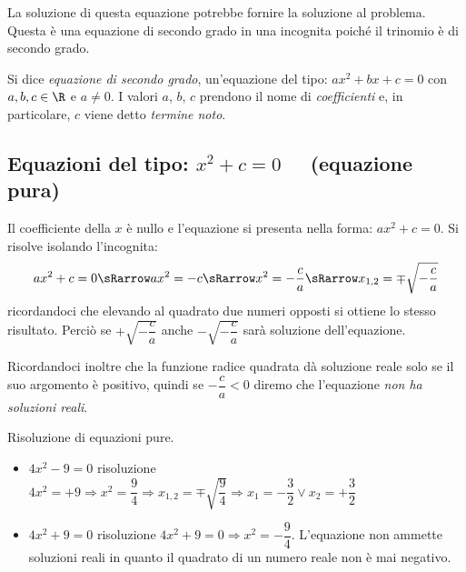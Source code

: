 La soluzione di questa equazione potrebbe fornire la soluzione al problema.
Questa è una equazione di secondo grado in una incognita poiché il trinomio è 
di secondo grado.
\begin{definizione}
Si dice \emph{equazione di secondo grado}, un'equazione del tipo: 
\(ax^2 +bx +c = 0\) con \(a, b, c \in \R\) e \(a \neq 0\). 
I valori \(a\), \(b\), \(c\) prendono il nome di \emph{coefficienti} e, in 
particolare, \(c\) viene detto \emph{termine noto}.
\end{definizione}


\subsection{Equazioni del tipo: \(x^2 +c = 0\)~~ (equazione pura)}
Il coefficiente della \(x\) è nullo e l'equazione si presenta nella forma: 
\(ax^2 +c = 0\).
Si risolve isolando l'incognita:
\[ax^2 +c = 0 \sRarrow ax^2 = -c \sRarrow x^2 = -\dfrac{c}{a} \sRarrow 
x_{1,2}=\mp \sqrt{-\dfrac{c}{a}}\]
ricordandoci che elevando al quadrato due numeri opposti si ottiene lo stesso 
risultato. 
Perciò se  \(+\sqrt{-\dfrac{c}{a}}\) anche \(-\sqrt{-\dfrac{c}{a}}\) sarà 
soluzione dell'equazione.

Ricordandoci inoltre che la funzione radice quadrata dà soluzione reale solo 
se il suo argomento è positivo, quindi se \quad \(-\dfrac{c}{a} < 0 \) \quad 
diremo che l'equazione \emph{non ha soluzioni reali}.

\begin{esempio}
 Risoluzione di equazioni pure.
\begin{itemize} [nosep]
\item \(4 x ^{2} -9 =0\) risoluzione
\(4x^2 = +9 \Rightarrow x^2 = \dfrac{9}{4}
\Rightarrow x_{1,2 } = \mp \sqrt{\dfrac{9}{4}} \Rightarrow 
x_1 = -\dfrac{3}{2} \vee x _2 = +\dfrac{3}{2}\)
\item \(4 x ^{2 } +9 = 0\) risoluzione \(4x^2 +9 = 0 \Rightarrow 
x^{2 } = -\dfrac{9}{4}\). 
L'equazione non ammette soluzioni reali in quanto il quadrato di un numero 
reale non è mai negativo.
\end{itemize}
\end{esempio}

